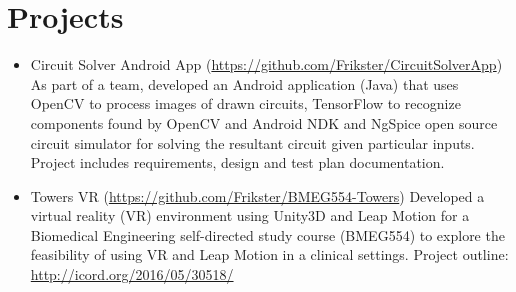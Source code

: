 \documentclass[11pt,a4paper,sans]{moderncv}        %
\begin{document}
\section{Projects}
  \begin{itemize} 
      \item{Circuit Solver Android App (\href{https://github.com/Frikster/CircuitSolverApp}{https://github.com/Frikster/CircuitSolverApp})}
      {As part of a team, developed an Android application (Java) that uses OpenCV to process images of drawn circuits, TensorFlow to recognize components found by OpenCV and Android NDK and NgSpice open source circuit simulator for solving the resultant circuit given particular inputs. Project includes requirements, design and test plan documentation.}
    \item{Towers VR (\href{https://github.com/Frikster/BMEG554-Towers}{https://github.com/Frikster/BMEG554-Towers})}
      {Developed a virtual reality (VR) environment using Unity3D and Leap Motion for a Biomedical Engineering self-directed study course (BMEG554) to explore the feasibility of using VR and Leap Motion in a clinical settings. Project outline: \href{http://icord.org/2016/05/30518/}{http://icord.org/2016/05/30518/} }
  \end{itemize}



  
  
\end{document}

